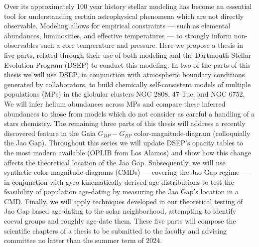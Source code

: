 Over its approximately 100 year history stellar modeling has become an
essential tool for understanding certain astrophysical phenomena which are not
directly observable. Modeling allows for empirical constraints --- such as
elemental abundances, luminosities, and effective temperatures --- to strongly
inform non-observables such a core temperature and pressure. Here we propose a
thesis in five parts, related through their use of both modeling and the
Dartmouth Stellar Evolution Program (DSEP) to conduct this modeling. In two of
the parts of this thesis we will use DSEP, in conjunction with atmospheric
boundary conditions generated by collaborators, to build chemically
self-consistent models of multiple populations (MPs) in the globular clusters
NGC 2808, 47 Tuc, and NGC 6752. We will infer helium abundances across MPs and
compare these inferred abundances to those from models which do not consider as
careful a handling of a stars chemistry. The remaining three parts of this
thesis will address a recently discovered feature in the Gaia $G_{BP} - G_{RP}$
color-magnitude-diagram (colloquially the Jao Gap). Throughout this series we
will update DSEP's opacity tables to the most modern available (OPLIB from Los
Alamos) and show how this change affects the theoretical location of the Jao
Gap. Subsequently, we will use synthetic color-magnitude-diagrams (CMDs) ---
covering the Jao Gap regime --- in conjunction with gyro-kinematically derived
age distributions to test the feasibility of population age-dating by measuring
the Jao Gap's location in a CMD. Finally, we will apply techniques developed in
our theoretical testing of Jao Gap based age-dating to the solar neighborhood,
attempting to identify coeval groups and roughly age-date them. These five
parts will compose the scientific chapters of a thesis to be submitted to the
faculty and advising committee no latter than the summer term of 2024.
